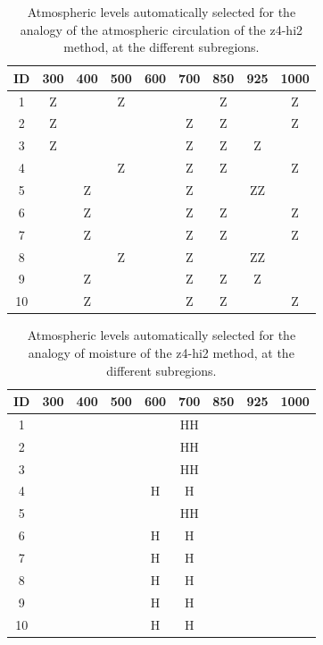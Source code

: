 \documentclass{ametsoc}
\begin{document}
\begin{table}[htbp]
	\footnotesize
	\caption{Atmospheric levels automatically selected for the analogy of the atmospheric circulation of the z4-hi2 method, at the different subregions.}
	\begin{center}
		\begin{tabular}{ccccccccc}
			\hline \textbf{ID} & \textbf{300} & \textbf{400} & \textbf{500} & \textbf{600} & \textbf{700} & \textbf{850} & \textbf{925} & \textbf{1000} \\ 
			\hline 
			1  & Z &   & Z &   &   & Z &   & Z \\
			2  & Z &   &   &   & Z & Z &   & Z \\
			3  & Z &   &   &   & Z & Z & Z &   \\
			4  &   &   & Z &   & Z & Z &   & Z \\
			5  &   & Z &   &   & Z &   & ZZ &   \\
			6  &   & Z &   &   & Z & Z &   & Z \\
			7  &   & Z &   &   & Z & Z &   & Z \\
			8  &   &   & Z &   & Z &   & ZZ &   \\
			9  &   & Z &   &   & Z & Z & Z &   \\
			10 &   & Z &   &   & Z & Z &   & Z \\
			\hline 
		\end{tabular} 
	\end{center}
	\label{table:levels_GA_z4_hi2}
\end{table}

\begin{table}[htbp]
	\footnotesize
	\caption{Atmospheric levels automatically selected for the analogy of moisture of the z4-hi2 method, at the different subregions.}
	\begin{center}
		\begin{tabular}{ccccccccc}
			\hline \textbf{ID} & \textbf{300} & \textbf{400} & \textbf{500} & \textbf{600} & \textbf{700} & \textbf{850} & \textbf{925} & \textbf{1000} \\ 
			\hline 
			1  &   &   &   &   & HH &   &   &   \\
			2  &   &   &   &   & HH &   &   &   \\
			3  &   &   &   &   & HH &   &   &   \\
			4  &   &   &   & H & H &   &   &   \\
			5  &   &   &   &   & HH &   &   &   \\
			6  &   &   &   & H & H &   &   &   \\
			7  &   &   &   & H & H &   &   &   \\
			8  &   &   &   & H & H &   &   &   \\
			9  &   &   &   & H & H &   &   &   \\
			10 &   &   &   & H & H &   &   &   \\
			\hline 
		\end{tabular} 
	\end{center}
	\label{table:levels_GA_z4_hi2_H}
\end{table}
\end{document}
